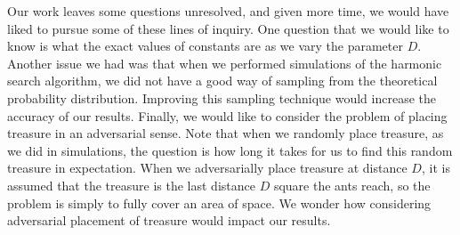 \documentclass[runningheads,a4paper]{llncs}
\begin{document}
Our work leaves some questions unresolved, and given more time, we would have liked to pursue some of these lines of inquiry. One question that we would like to know is what the exact values of constants are as we vary the parameter $D$. Another issue we had was that when we performed simulations of the harmonic search algorithm, we did not have a good way of sampling from the theoretical probability distribution. Improving this sampling technique would increase the accuracy of our results. Finally, we would like to consider the problem of placing treasure in an adversarial sense. Note that when we randomly place treasure, as we did in simulations, the question is how long it takes for us to find this random treasure in expectation. When we adversarially place treasure at distance $D$, it is assumed that the treasure is the last distance $D$ square the ants reach, so the problem is simply to fully cover an area of space. We wonder how considering adversarial placement of treasure would impact our results.



\end{document}
